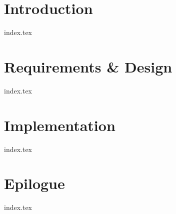 \part{Introduction}
{index.tex}
\part{Requirements \& Design}
{index.tex}
\part{Implementation}\label{part:implementation}
{index.tex}
\part{Epilogue}
{index.tex}
